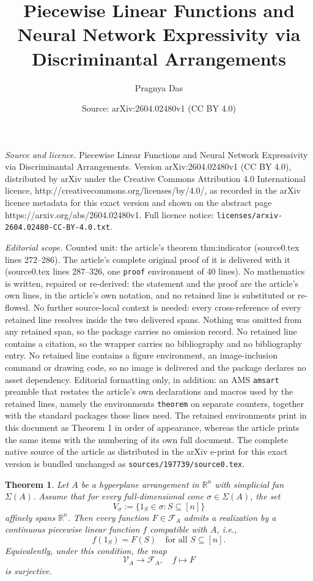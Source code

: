 \documentclass[10pt,a4paper]{amsart}
\title{Piecewise Linear Functions and Neural Network Expressivity via Discriminantal Arrangements}
\author{Pragnya Das}
\date{Source: arXiv:2604.02480v1 (CC BY 4.0)}
\newtheorem{theorem}{Theorem}
\begin{document}
\maketitle

\noindent\emph{Source and licence.} Piecewise Linear Functions and Neural Network Expressivity via Discriminantal Arrangements. Version arXiv:2604.02480v1 (CC BY 4.0), distributed by arXiv under the Creative Commons Attribution 4.0 International licence, http://creativecommons.org/licenses/by/4.0/, as recorded in the arXiv licence metadata for this exact version and shown on the abstract page https://arxiv.org/abs/2604.02480v1. Full licence notice: \texttt{licenses/arxiv-2604.02480-CC-BY-4.0.txt}.\par\smallskip

\noindent\textit{Editorial scope.} Counted unit: the article's theorem thm:indicator (source0.tex lines 272--286). The article's complete original proof of it is delivered with it (source0.tex lines 287--326, one \texttt{proof} environment of 40 lines). No mathematics is written, repaired or re-derived: the statement and the proof are the article's own lines, in the article's own notation, and no retained line is substituted or re-flowed.  No further source-local context is needed: every cross-reference of every retained line resolves inside the two delivered spans.  Nothing was omitted from any retained span, so the package carries no omission record.  No retained line contains a citation, so the wrapper carries no bibliography and no bibliography entry.  No retained line contains a figure environment, an image-inclusion command or drawing code, so no image is delivered and the package declares no asset dependency.  Editorial formatting only, in addition: an AMS \texttt{amsart} preamble that restates the article's own declarations and macros used by the retained lines, namely the environments \texttt{theorem} on separate counters, together with the standard packages those lines need.  The retained environments print in this document as Theorem 1 in order of appearance, whereas the article prints the same items with the numbering of its own full document.  The complete native source of the article as distributed in the arXiv e-print for this exact version is bundled unchanged as \texttt{sources/197739/source0.tex}.
\begin{theorem}\label{thm:indicator}
Let $A$ be a hyperplane arrangement in $\mathbb{R}^n$ with simplicial fan $\Sigma(A)$. Assume that for every full-dimensional cone $\sigma \in \Sigma(A)$, the set
\[
V_\sigma := \{1_S \in \sigma : S \subseteq [n]\}
\]
affinely spans $\mathbb{R}^n$. Then every function $F \in \mathcal{F}_A$ admits a realization by a continuous piecewise linear function $f$ compatible with $A$, i.e.,
\[
f(1_S) = F(S) \quad \text{for all } S \subseteq [n].
\]
Equivalently, under this condition, the map
\[
\mathcal{V}_A \to \mathcal{F}_A, \quad f \mapsto F
\]
is surjective.
\end{theorem}
\end{document}
